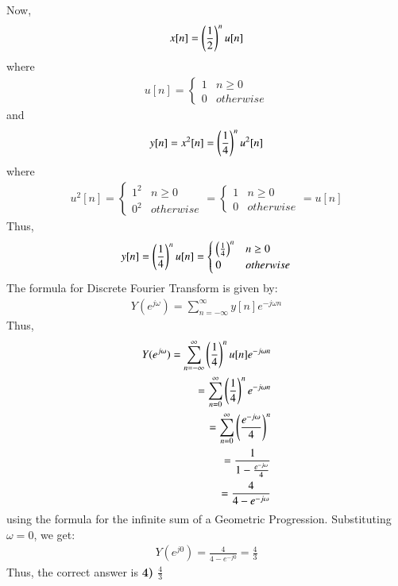 \documentclass[journal,12pt,twocolumn]{IEEEtran}
\begin{document}
Now,
\begin{align}
    x[n] = \left(\frac{1}{2}\right)^n u[n] 
    \end{align}
    where
    \begin{align}
    u[n] = 
    \begin{cases}
    1 & n\geq0\\
    0 & otherwise
    \end{cases}
\end{align}
and 
\begin{align}
    y[n] = x^2[n] = \left(\frac{1}{4}\right)^nu^2[n]
\end{align}
where
\begin{align}
    u^2[n] = 
    \begin{cases}
    1^2 & n\geq 0\\
    0^2 & otherwise
    \end{cases}
    =
    \begin{cases}
    1 & n\geq0\\
    0 & otherwise
    \end{cases}
     = u[n]
\end{align}
Thus,
\begin{align}
    y[n] = \left(\frac{1}{4}\right)^nu[n] = \begin{cases}
    \left(\frac{1}{4}\right)^n & n\geq0\\
    0 & otherwise
    \end{cases}
\end{align}
The formula for Discrete Fourier Transform is given by:
\begin{align}
    Y(e^{j\omega}) = \sum_{n = -\infty}^{\infty} y[n]e^{-j\omega n}
\end{align}
Thus, 
\begin{align}
    Y(e^{j\omega}) = \sum_{n = -\infty}^{\infty} \left(\frac{1}{4}\right)^nu[n]e^{-j\omega n}\\
     =  \sum_{n = 0}^{\infty} \left(\frac{1}{4}\right)^ne^{-j\omega n}\\
      = \sum_{n = 0}^{\infty} \left(\frac{e^{-j\omega}}{4}\right)^n\\
       = \frac{1}{1 - \frac{e^{-j\omega}}{4}}\\
       = \frac{4}{4 - e^{-j\omega}}
\end{align}
using the formula for the infinite sum of a Geometric Progression. Substituting $\omega = 0$, we get:
\begin{align}
    Y(e^{j0}) = \frac{4}{4-e^{-j0}} = \frac{4}{3}
\end{align}
Thus, the correct answer is \textbf{4) $\frac{4}{3}$}
\end{document}
